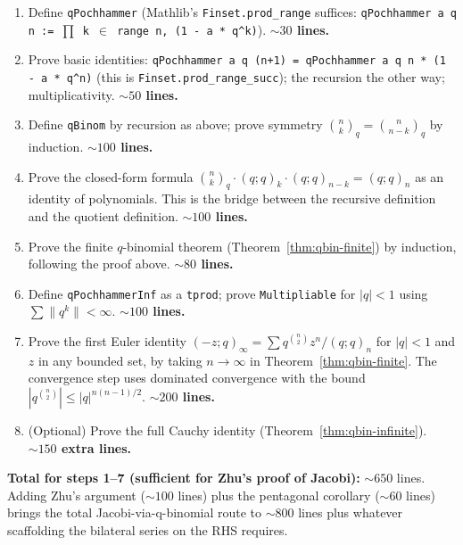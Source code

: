 \begin{enumerate}\item Define \texttt{qPochhammer} (Mathlib's \texttt{Finset.prod\_range} suffices: \texttt{qPochhammer a q n := $\prod$ k $\in$ range n, (1 - a * q\^{}k)}). \textbf{$\sim 30$ lines.}

\item Prove basic identities: \texttt{qPochhammer a q (n+1) = qPochhammer a q n * (1 - a * q\^{}n)} (this is \texttt{Finset.prod\_range\_succ}); the recursion the other way; multiplicativity. \textbf{$\sim 50$ lines.}

\item Define \texttt{qBinom} by recursion as above; prove symmetry $\binom{n}{k}_q = \binom{n}{n-k}_q$ by induction. \textbf{$\sim 100$ lines.}

\item Prove the closed-form formula $\binom{n}{k}_q \cdot (q;q)_k \cdot (q;q)_{n-k} = (q;q)_n$ as an identity of polynomials. This is the bridge between the recursive definition and the quotient definition. \textbf{$\sim 100$ lines.}

\item Prove the finite $q$-binomial theorem (Theorem~\ref{thm:qbin-finite}) by induction, following the proof above. \textbf{$\sim 80$ lines.}

\item Define \texttt{qPochhammerInf} as a \texttt{tprod}; prove \texttt{Multipliable} for $|q| < 1$ using $\sum \|q^k\| < \infty$. \textbf{$\sim 100$ lines.}

\item Prove the first Euler identity $(-z; q)_\infty = \sum q^{\binom{n}{2}} z^n / (q;q)_n$ for $|q| < 1$ and $z$ in any bounded set, by taking $n \to \infty$ in Theorem~\ref{thm:qbin-finite}. The convergence step uses dominated convergence with the bound $|q^{\binom{n}{2}}| \leq |q|^{n(n-1)/2}$. \textbf{$\sim 200$ lines.}

\item (Optional) Prove the full Cauchy identity (Theorem~\ref{thm:qbin-infinite}). \textbf{$\sim 150$ extra lines.}
\end{enumerate}

\textbf{Total for steps 1--7 (sufficient for Zhu's proof of Jacobi):} $\sim 650$ lines. Adding Zhu's argument ($\sim 100$ lines) plus the pentagonal corollary ($\sim 60$ lines) brings the total Jacobi-via-q-binomial route to $\sim 800$ lines plus whatever scaffolding the bilateral series on the RHS requires.

